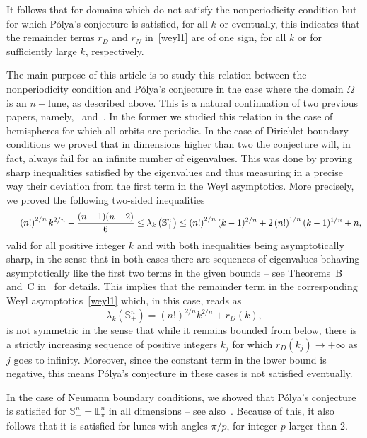 \documentclass[11pt,a4paper,times]{amsart}
\theoremstyle{plain}
\theoremstyle{definition}
\numberwithin{equation}{section}
\newcommand{\ds}{\displaystyle}
\newcommand{\Se}{\mathbb{S}}
\newcommand{\fr}[2]{\frac{\ds #1}{\ds #2}}
\newcommand{\lune}[2]{\mathbb{L}^{#1}_{#2}}
\begin{document}
It follows that for domains which do not satisfy the nonperiodicity condition but for which P\'{o}lya's conjecture
is satisfied, for all $k$ or eventually, this indicates that the remainder terms $r_{D}$ and $r_{N}$
in~\eqref{weyl1} are of one sign, for all $k$ or for sufficiently large $k$, respectively.

The main purpose of this article is to study this relation between the nonperiodicity condition and P\'{o}lya's
conjecture in the case where the  domain $\Omega$ is an $n-$lune, as described above. This is a natural continuation
of two previous papers, namely,~\cite{fms} and~\cite{fs}. In the former we studied this relation in the case of
hemispheres for which all orbits are periodic. In the case of Dirichlet boundary conditions we proved that in
dimensions higher than two the conjecture will, in fact, always fail for an infinite number of eigenvalues. This was
done by proving sharp inequalities satisfied by the eigenvalues and thus measuring in a precise way their
deviation from the first term in the Weyl asymptotics. More precisely, we proved the following two-sided
inequalities
\begin{equation}\label{uplowfms}
\hspace*{5mm} \left(n!\right)^{2/n}k^{2/n} -\fr{(n-1)(n-2)}{6}\leq \lambda_{k}\left(\Se^n_+\right) \leq
 \left(n!\right)^{2/n}(k-1)^{2/n} + 2\left(n!\right)^{1/n}(k-1)^{1/n}+n,
\end{equation}
valid for all positive integer $k$ and with both inequalities being asymptotically sharp, {in the sense that
in both cases there are sequences of eigenvalues behaving asymptotically like the first two terms in the given
bounds} -- see Theorems~B and~C in~\cite{fms} for details. This implies that the remainder term in the corresponding
Weyl asymptotics~\eqref{weyl1} which, in this case, reads as
\[
 \lambda_{k}\left(\Se^n_+\right) = \left(n!\right)^{2/n}k^{2/n} + r_{D}(k),
\]
is not symmetric in the sense that while it remains bounded from below, there is a strictly increasing sequence of
positive integers $k_{j}$ for which $r_{D}\left(k_{j}\right)\to +\infty$ as $j$ goes to infinity.  Moreover, since
the constant term in the lower bound is negative, this means P\'{o}lya's conjecture in these cases is not satisfied
eventually.

In the case of Neumann boundary conditions, we showed that P\'{o}lya's conjecture is satisfied for
$\Se_{+}^{n}=\lune{n}{\pi}$ in all dimensions -- see also~\cite{blps}. Because of this, it also follows that it is satisfied
for lunes with angles $\pi/p$, for integer $p$ larger than $2$.
\end{document}
